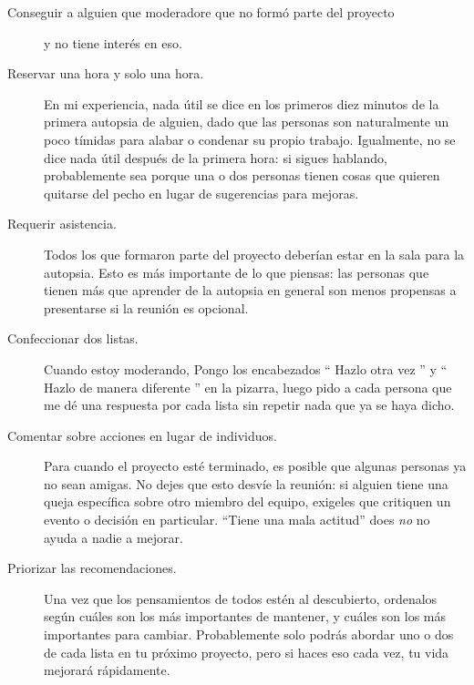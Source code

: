 \begin{description}

\item[Conseguir a alguien que moderadore que no formó parte del proyecto]
  y no tiene interés en eso.

\item[Reservar una hora y solo una hora.]
  En mi experiencia,
  nada útil se dice en los primeros diez minutos de la primera autopsia de alguien,
  dado que las personas son naturalmente un poco tímidas para alabar o condenar su propio trabajo.
  Igualmente,
  no se dice nada útil después de la primera hora:
  si sigues hablando,
  probablemente sea porque una o dos personas
  tienen cosas que quieren quitarse del pecho
  en lugar de sugerencias para mejoras.

\item[Requerir asistencia.]
  Todos los que formaron parte del proyecto deberían estar en la sala para la autopsia.
  Esto es más importante de lo que piensas:
  las personas que tienen más que aprender de la autopsia
  en general son menos propensas a presentarse si la reunión es opcional.

\item[Confeccionar dos listas.]
  Cuando estoy moderando,
  Pongo los encabezados `` Hazlo otra vez '' y `` Hazlo de manera diferente '' en la pizarra,
  luego pido a cada persona que me dé una respuesta por cada lista 
  sin repetir nada que ya se haya dicho.

\item[Comentar sobre acciones en lugar de individuos.]
  Para cuando el proyecto esté terminado,
  es posible que algunas personas ya no sean amigas.
  No dejes que esto desvíe la reunión:
  si alguien tiene una queja específica sobre otro miembro del equipo,
  exigeles que critiquen un evento o decisión en particular.
  ``Tiene una mala actitud'' does \emph{no} no ayuda a nadie a mejorar.

\item[Priorizar las recomendaciones.]
  Una vez que los pensamientos de todos estén al descubierto,
  ordenalos según cuáles son los más importantes de mantener,
  y cuáles son los más importantes para cambiar.
  Probablemente solo podrás abordar uno o dos de cada lista en tu próximo proyecto,
  pero si haces eso cada vez,
  tu vida mejorará rápidamente.

\end{description}
